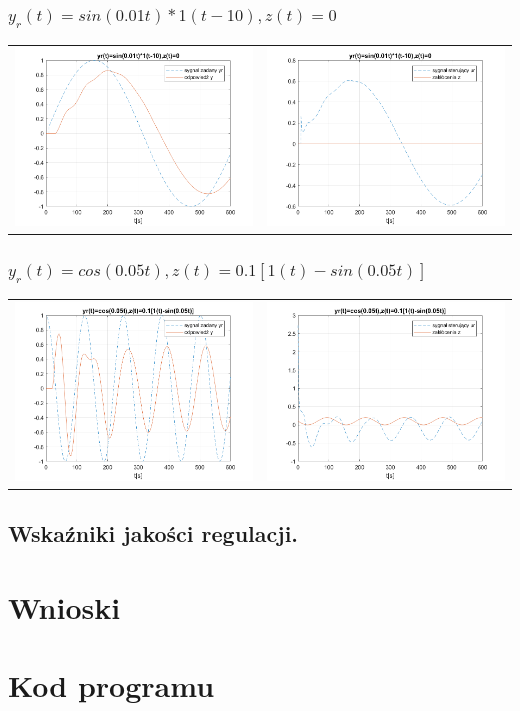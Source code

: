 \documentclass[a4paper]{article}
\begin{document}
\subsubsection{$y_r(t)=sin(0.01t)*1(t-10), z(t)=0$}
\begin{tabular}{cc}
	\includegraphics[width=7cm]{pkt5_3a} &	\includegraphics[width=7cm]{pkt5_3b}
\end{tabular}
\subsubsection{$y_r(t)=cos(0.05t), z(t)=0.1[1(t)-sin(0.05t)]$}
\begin{tabular}{cc}
	\includegraphics[width=7cm]{pkt5_4a} &	\includegraphics[width=7cm]{pkt5_4b}
\end{tabular}
\subsection{Wskaźniki jakości regulacji.}

\section{Wnioski}

\section{Kod programu}
\end{document}
